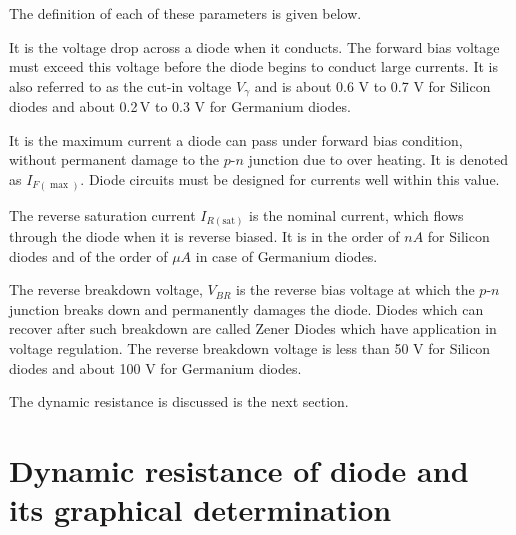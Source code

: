 The definition of each of these parameters is given below.

\bigskip
{}

\noindent
 It is the voltage drop across a diode when it conducts. The forward
 bias voltage must exceed this voltage before the diode begins to
 conduct large currents. It is also referred to as the cut-in voltage
 $V_\gamma$ and is about 0.6 V to 0.7 V for Silicon diodes and about
 0.2\,V to 0.3 V for Germanium diodes.
 

\noindent
It is the maximum current a diode can pass under forward bias
condition, without permanent damage to the $p$-$n$ junction due to
over heating. It is denoted as $I_{F(\max)}$. Diode circuits must be
designed for currents well within this value.
 
\medskip
{}

\noindent
The reverse saturation current $I_{R(\text{sat})}$ is the nominal
current, which flows through the diode when it is reverse biased. It
is in the order of $nA$ for Silicon diodes and of the order of $\mu A$
in case of Germanium diodes.

\medskip
{}

\noindent
The reverse breakdown voltage, $V_{BR}$ is the reverse bias voltage at
which the $p$-$n$ junction breaks down and permanently damages the
diode. Diodes which can recover after such breakdown are called Zener
Diodes which have application in voltage regulation. The reverse
breakdown voltage is less than 50 V for Silicon diodes and about 100
V for Germanium diodes.

The dynamic resistance is discussed is the next section.\\[-20pt]

\section{Dynamic resistance of diode and its graphical determination}\label{sec1.11}

